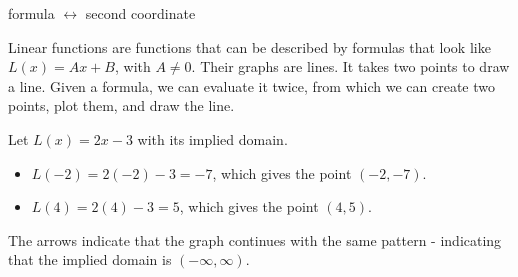 \documentclass{ximera}
\begin{document}
\begin{center}
formula $\leftrightarrow$ second coordinate
\end{center}








\begin{example}

Linear functions are functions that can be described by formulas that look like $L(x) = A x + B$, with $A \ne 0$.  Their graphs are lines.  It takes two points to draw a line. Given a formula, we can evaluate it twice, from which we can create two points, plot them, and draw the line.

Let $L(x) = 2x-3$ with its implied domain.

\begin{itemize}
\item $L(-2) = 2(-2) - 3 = -7$, which gives the point $(-2, -7)$.
\item $L(4) = 2(4) - 3 = 5$, which gives the point $(4, 5)$.
\end{itemize}






\begin{image}
\end{image}

The arrows indicate that the graph continues with the same pattern - indicating that the implied domain is $(-\infty, \infty)$.


\end{example}
\end{document}
